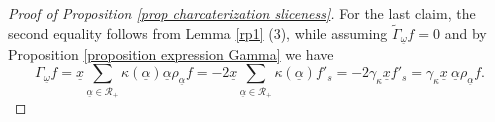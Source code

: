 \documentclass{amsart}
\newtheorem{lemma}[theorem]{Lemma}
\newtheorem{corollary}[theorem]{Corollary}
\theoremstyle{definition}
\theoremstyle{remark}
\numberwithin{equation}{section}
\begin{document}
\begin{proof}[Proof of Proposition \ref{prop charcaterization sliceness}]
    
    For the last claim, the second equality follows from Lemma \ref{rp1} (3), while assuming $\widetilde{\Gamma}_{\underline\omega}f=0$ and by Proposition \ref{proposition expression Gamma} we have
    \begin{equation*}
        \Gamma_{\underline\omega}f=\underline x\sum_{\underline\alpha\in \mathscr{R}_+}\kappa(\underline\alpha)\underline\alpha \rho_{\underline\alpha}f=-2\underline x\sum_{\underline\alpha\in \mathscr{R}_+}\kappa(\underline\alpha)f'_s=-2 \gamma_{\kappa}\underline xf'_s= \gamma_{\kappa}\underline x\ \underline\alpha \rho_{\underline\alpha}f.
    \end{equation*}
\end{proof}
\end{document}
